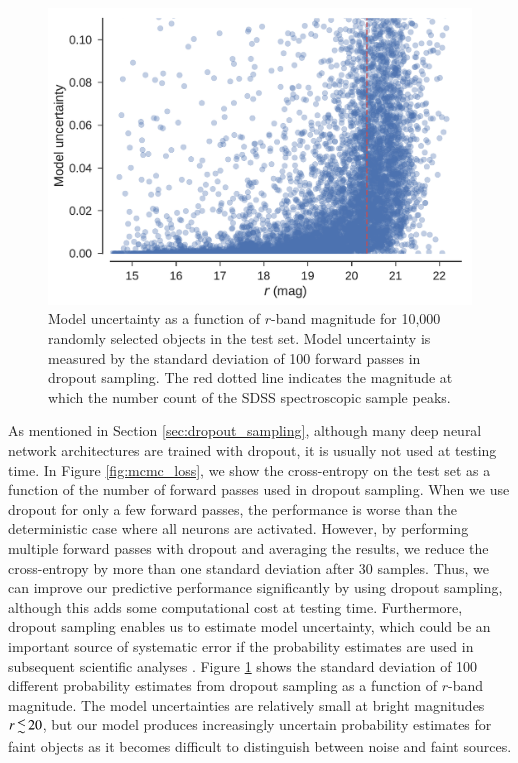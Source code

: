 \documentclass[fleqn,usenatbib]{mnras}
\begin{document}
\begin{figure}
  \centering
  \includegraphics[width=\columnwidth]{figures/uncertainty_vs_mag.pdf}
  \caption{
    Model uncertainty as a function of $r$-band magnitude for 10,000 randomly selected objects in the test set.
    Model uncertainty is measured by the standard deviation of 100 forward passes in dropout sampling.
    The red dotted line indicates the magnitude at which the number count of the SDSS spectroscopic sample peaks.
    }
  \label{fig:uncertainty_vs_mag}
\end{figure}

As mentioned in Section \ref{sec:dropout_sampling}, although many deep neural network architectures are trained with dropout,
it is usually not used at testing time.
In Figure \ref{fig:mcmc_loss}, we show the cross-entropy on the test set as a function of the number of forward passes
used in dropout sampling.
When we use dropout for only a few forward passes, the performance is worse than the deterministic case where all neurons are activated.
However, by performing multiple forward passes with dropout and averaging the results, we reduce the cross-entropy by more than one
standard deviation after 30 samples.
Thus, we can improve our predictive performance significantly by using dropout sampling, although this adds some computational cost
at testing time.
Furthermore, dropout sampling enables us to estimate model uncertainty, which could be an important source of systematic error
if the probability estimates are used in subsequent scientific analyses \citep{ross2011ameliorating}.
Figure \ref{fig:uncertainty_vs_mag} shows the standard deviation of 100 different probability estimates from dropout sampling
as a function of $r$-band magnitude.
The model uncertainties are relatively small at bright magnitudes $r \la 20$, but our model produces increasingly uncertain
probability estimates for faint objects as it becomes difficult to distinguish between noise and faint sources.
\end{document}
